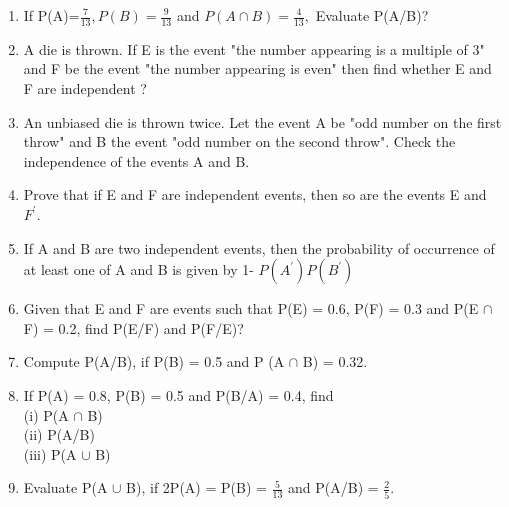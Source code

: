 \begin{enumerate}[label=\thesection.\arabic*.,ref=\thesection.\theenumi]
\item If P(A)=$\frac{7}{13}, P(B)=\frac{9}{13}$ and $P(A\cap B)=\frac{4}{13},$ Evaluate P(A/B)?
\\

\item A die is thrown. If E is the event "the number appearing is a multiple of 3" and F be the event "the number appearing is even" then find whether E and F are independent ?\\

\item An unbiased die is thrown twice. Let the event A be "odd number on the first throw" and B the event "odd number on the second throw". Check the independence of the events A and B.\\
\solution



\item Prove that if E and F are independent events, then so are the events E and $F^{'}$.\\
\solution


\item If A and B are two independent events, then the probability of occurrence of at least one of A and B is given by 1- $P(A^{'}) P(B^{'})$\\
\solution

\item Given that E and F are events such that P(E) = 0.6, P(F) = 0.3 and P(E $\cap$ F) = 0.2, find P(E/F) and P(F/E)?\\

\item Compute P(A/B), if P(B) = 0.5 and P (A $\cap$ B) = 0.32.\\

\item If P(A) = 0.8, P(B) = 0.5 and P(B/A) = 0.4, find\\
(i) P(A $\cap$ B)\\
(ii) P(A/B)\\ 
(iii) P(A $\cup$ B)\\

\item Evaluate P(A $\cup$ B), if 2P(A) = P(B)  = $\frac{5}{13}$ and P(A/B) =  $\frac{2}{5}.$\\


\end{enumerate}
